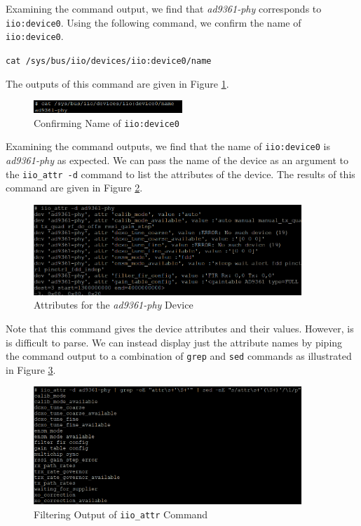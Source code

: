 \documentclass{article}
\begin{document}
Examining the command output, we find that \textit{ad9361-phy} corresponds to \texttt{iio:device0}. Using the following command, we confirm the name of \texttt{iio:device0}.

\begin{center}
\texttt{cat /sys/bus/iio/devices/iio:device0/name}
\end{center}

The outputs of this command are given in Figure \ref{fig::iio_device0_name}.

\begin{figure}[H]
	\centerline{\includegraphics[width=0.5\textwidth]{iio_device0_name.png}}
	\caption{Confirming Name of \texttt{iio:device0}}
	\label{fig::iio_device0_name}
\end{figure}

Examining the command outputs, we find that the name of \texttt{iio:device0} is \textit{ad9361-phy} as expected. We can pass the name of the device as an argument to the \texttt{iio\_attr -d} command to list the attributes of the device. The results of this command are given in Figure \ref{fig::iio_raw_attributes}.

\begin{figure}[H]
	\centerline{\includegraphics[width=0.9\textwidth]{iio_raw_attributes.png}}
	\caption{Attributes for the \textit{ad9361-phy} Device}
	\label{fig::iio_raw_attributes}
\end{figure}

Note that this command gives the device attributes and their values. However, is is difficult to parse. We can instead display just the attribute names by piping the command output to a combination of \texttt{grep} and \texttt{sed} commands as illustrated in Figure \ref{fig::iio_filtered_attributes}.

\begin{figure}[H]
	\centerline{\includegraphics[width=0.9\textwidth]{iio_filtered_attributes.png}}
	\caption{Filtering Output of \texttt{iio\_attr} Command}
	\label{fig::iio_filtered_attributes}
\end{figure}
\end{document}
